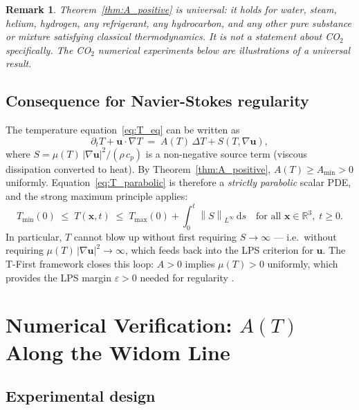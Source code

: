 \documentclass[12pt,a4paper]{article}
\newtheorem{remark}[theorem]{Remark}
\newcommand{\R}{\mathbb{R}}
\newcommand{\muT}{\mu(T)}           %
\newcommand{\norm}[1]{\left\|#1\right\|}
\newcommand{\eps}{\varepsilon}
\newcommand{\Amin}{A_{\min}}
\begin{document}
\begin{remark}
  Theorem~\ref{thm:A_positive} is \emph{universal}: it holds for water, steam,
  helium, hydrogen, any refrigerant, any hydrocarbon, and any other pure substance
  or mixture satisfying classical thermodynamics.  It is not a statement about
  CO$_2$ specifically.  The CO$_2$ numerical experiments below are illustrations
  of a universal result.
\end{remark}

\subsection{Consequence for Navier-Stokes regularity}
\label{sec:theorem:NS}

The temperature equation~\eqref{eq:T_eq} can be written as
\begin{equation}
  \partial_t T + \bm{u}\cdot\nabla T \;=\; A(T)\,\Delta T + S(T,\nabla\bm{u}),
  \label{eq:T_parabolic}
\end{equation}
where $S = \muT\,|\nabla\bm{u}|^2 / (\rho\,c_p)$ is a non-negative source term
(viscous dissipation converted to heat).  By Theorem~\ref{thm:A_positive},
$A(T) \geq \Amin > 0$ uniformly.  Equation~\eqref{eq:T_parabolic} is therefore a
\emph{strictly parabolic} scalar PDE, and the strong maximum principle applies:
\begin{equation}
  T_{\min}(0) \;\leq\; T(\bm{x},t) \;\leq\; T_{\max}(0) + \int_0^t \norm{S}_{L^\infty}\,\mathrm{d}s
  \quad \text{for all } \bm{x} \in \R^3,\; t \geq 0.
\end{equation}
In particular, $T$ cannot blow up without first requiring $S \to \infty$ ---
i.e.\ without requiring $\muT\,|\nabla\bm{u}|^2 \to \infty$, which feeds back
into the LPS criterion for $\bm{u}$.  The T-First framework closes this loop:
$A > 0$ implies $\muT > 0$ uniformly, which provides the LPS margin
$\eps > 0$ needed for regularity \citep{TFirst2026}.

\section{Numerical Verification: $A(T)$ Along the Widom Line}
\label{sec:numerical}

\subsection{Experimental design}
\label{sec:numerical:design}
\end{document}
